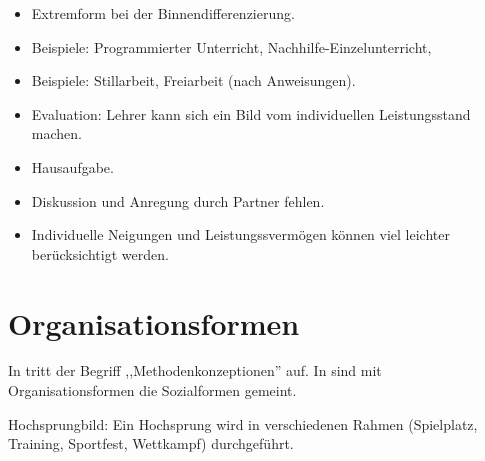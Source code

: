 \begin{itemize}
\item Extremform bei der Binnendifferenzierung.
\item Beispiele: Programmierter Unterricht,
Nachhilfe-Einzelunterricht,
\item Beispiele: Stillarbeit, Freiarbeit (nach Anweisungen).
\item Evaluation: Lehrer kann sich ein Bild vom individuellen
Leistungsstand  machen.
\item Hausaufgabe.
\item Diskussion und Anregung durch Partner fehlen.
\item Individuelle Neigungen und Leistungssverm\"{o}gen k\"{o}nnen viel
leichter ber\"{u}cksichtigt werden.
\end{itemize}



\bip\bip
\section{Organisationsformen}\label{Orga}

In \cite[S.\ 97]{DuitHausslerKircher} tritt der Begriff
,,Methodenkonzeptionen'' auf.
In \cite{BleichrothDahnckeJung} sind mit Organisationsformen
die Sozialformen gemeint.

\mip Hochsprungbild: Ein Hochsprung wird in verschiedenen
Rahmen (Spielplatz, Training, Sportfest, Wettkampf) durchgef\"{u}hrt.


